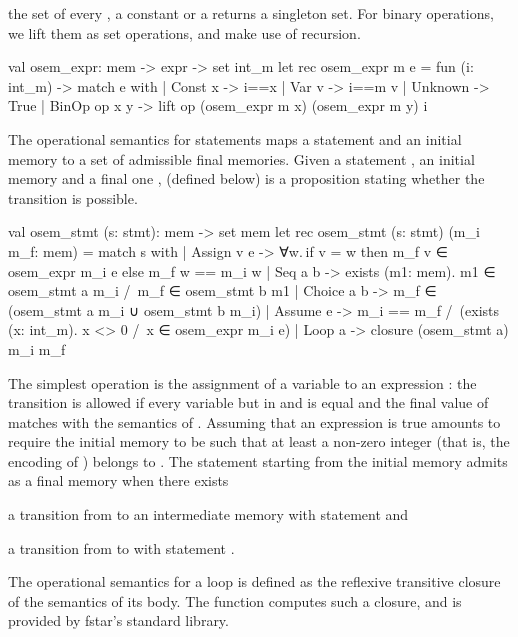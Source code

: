 \documentclass{llncs}
\begin{document}
the set of every , a constant or a 
returns a singleton set. For binary operations, we lift them as
set operations, and make use of recursion.
%
\begin{fstarcode}
val osem_expr: mem -> expr -> set int_m
let rec osem_expr m e = fun (i: int_m) 
  -> match e with | Const x -> i==x | Var v -> i==m v | Unknown -> True
  | BinOp op x y -> lift op (osem_expr m x) (osem_expr m y) i
\end{fstarcode}
%
The operational semantics for statements maps a statement and an
initial memory to a set of admissible final memories.
%
Given a statement , an initial memory  and a
final one , 
(defined below) is a proposition stating whether the
transition is possible.
%
\begin{fstarcode}
val osem_stmt (s: stmt): mem -> set mem
let rec osem_stmt (s: stmt) (m_i m_f: mem)
  = match s with
  | Assign v e -> ∀w. if v = w then m_f v ∈ osem_expr m_i e
                              else m_f w == m_i w
  | Seq a b  -> exists (m1: mem). m1 ∈ osem_stmt a m_i /\ m_f ∈ osem_stmt b m1
  | Choice a b -> m_f ∈ (osem_stmt a m_i ∪ osem_stmt b m_i)
  | Assume e -> m_i == m_f /\ (exists (x: int_m). x <> 0 /\ x ∈ osem_expr m_i e)
  | Loop a -> closure (osem_stmt a) m_i m_f
\end{fstarcode}
%
The simplest operation is the assignment of a variable 
to an expression : the transition is allowed if every
variable but  in  and  is equal and
the final value of  matches with the semantics of
.
%
Assuming that an expression is true amounts to require the initial
memory to be such that at least a non-zero integer (that is, the
encoding of ) belongs to .
%
The statement  starting from the initial memory
 admits  as a final memory when there exists
\begin{enumi} \item a transition from  to an
intermediate memory  with statement  and \item
a transition from  to  with statement
.  \end{enumi}
%
The operational semantics for a loop is defined as the reflexive
transitive closure of the semantics of its body.
%
The  function computes such a closure, and is
provided by \gls{fstar}'s standard library.
%
\end{document}
